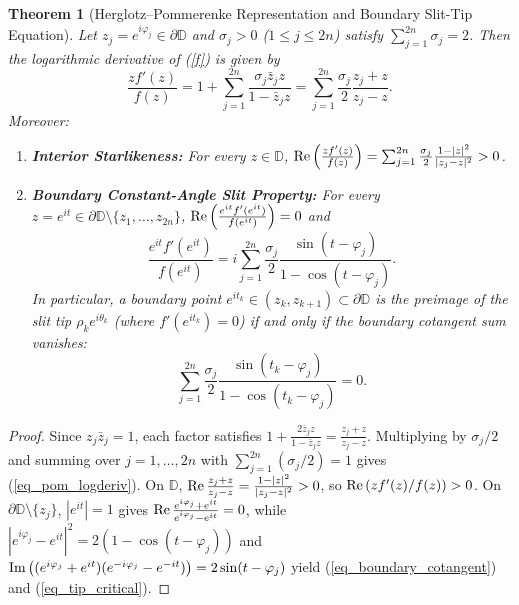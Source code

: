 \documentclass[11pt,reqno]{amsart}
\newtheorem{thm}{Theorem}[section]
\numberwithin{equation}{section}
\renewcommand{\phi}{\varphi}
\newcommand{\D}{\mathbb{D}}
\newcommand{\re}{\mbox{\rm Re\,}}
\newcommand{\im}{\mbox{\rm Im\,}}
\begin{document}
\begin{thm}[Herglotz--Pommerenke Representation and Boundary Slit-Tip Equation] \label{thm_pommerenke_herglotz}
Let $z_j = e^{i\phi_j} \in \partial\D$ and $\sigma_j > 0$ ($1 \le j \le 2n$) satisfy $\sum_{j=1}^{2n} \sigma_j = 2$. Then the logarithmic derivative of (\ref{f}) is given by
\begin{equation} \label{eq_pom_logderiv}
  \frac{z f'(z)}{f(z)}
  = 1 + \sum_{j=1}^{2n} \frac{\sigma_j \bar{z}_j z}{1 - \bar{z}_j z}
  = \sum_{j=1}^{2n} \frac{\sigma_j}{2} \frac{z_j + z}{z_j - z}.
\end{equation}
Moreover:
\begin{enumerate}
\item \textbf{Interior Starlikeness:} For every $z \in \D$, $\re\!\left(\frac{z f'(z)}{f(z)}\right) = \sum_{j=1}^{2n} \frac{\sigma_j}{2} \frac{1 - |z|^2}{|z_j - z|^2} > 0$.
\item \textbf{Boundary Constant-Angle Slit Property:} For every $z = e^{it} \in \partial\D \setminus \{z_1, \dots, z_{2n}\}$, $\re\!\left(\frac{e^{it} f'(e^{it})}{f(e^{it})}\right) = 0$ and
\begin{equation} \label{eq_boundary_cotangent}
  \frac{e^{it} f'(e^{it})}{f(e^{it})}
  = i \sum_{j=1}^{2n} \frac{\sigma_j}{2} \frac{\sin(t - \phi_j)}{1 - \cos(t - \phi_j)}.
\end{equation}
In particular, a boundary point $e^{it_k} \in (z_k, z_{k+1}) \subset \partial\D$ is the preimage of the slit tip $\rho_k e^{i\theta_k}$ (where $f'(e^{it_k}) = 0$) if and only if the boundary cotangent sum vanishes:
\begin{equation} \label{eq_tip_critical}
  \sum_{j=1}^{2n} \frac{\sigma_j}{2} \frac{\sin(t_k - \phi_j)}{1 - \cos(t_k - \phi_j)} = 0.
\end{equation}
\end{enumerate}
\end{thm}
\begin{proof}
Since $z_j \bar{z}_j = 1$, each factor satisfies $1 + \frac{2\bar{z}_j z}{1 - \bar{z}_j z} = \frac{z_j + z}{z_j - z}$. Multiplying by $\sigma_j / 2$ and summing over $j = 1, \dots, 2n$ with $\sum_{j=1}^{2n} (\sigma_j / 2) = 1$ gives (\ref{eq_pom_logderiv}). On $\D$, $\re\frac{z_j + z}{z_j - z} = \frac{1 - |z|^2}{|z_j - z|^2} > 0$, so $\re(z f'(z)/f(z)) > 0$. On $\partial\D \setminus \{z_j\}$, $|e^{it}| = 1$ gives $\re\frac{e^{i\phi_j}+e^{it}}{e^{i\phi_j}-e^{it}} = 0$, while $|e^{i\phi_j} - e^{it}|^2 = 2(1 - \cos(t - \phi_j))$ and $\im\bigl((e^{i\phi_j} + e^{it})(e^{-i\phi_j} - e^{-it})\bigr) = 2\sin(t - \phi_j)$ yield (\ref{eq_boundary_cotangent}) and (\ref{eq_tip_critical}).
\end{proof}
\end{document}
